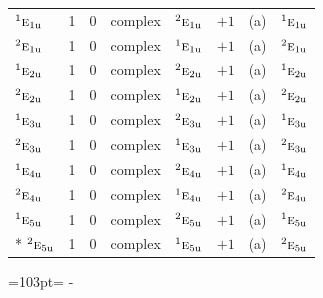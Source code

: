 \documentclass[10pt,a4paper]{article}
\newcommand{\needspace}[1]{\par\penalty-100\begingroup\dimen0=#1\relax\dimen2=\pagegoal
  \advance\dimen2-\pagetotal\ifdim\dimen0>\dimen2\relax\ifdim\dimen2>0pt\vfil\break\fi\fi
  \endgroup}
\numberwithin{equation}{section}
\newcommand{\irr}[1]{\text{\normalfont\scshape #1}}
\newcommand{\conjpair}[1]{{}^{#1}}
\newcommand{\ptag}[1]{\mathrm{#1}}
\begin{document}
{\begin{longtable}{@{}lrrllrll@{}}
$\conjpair{1}\irr{e}_{1\ptag{u}}$ & 1 & $0$ & complex & $\conjpair{2}\irr{e}_{1\ptag{u}}$ & $+1$ & (a) & $\conjpair{1}\irr{e}_{1\ptag{u}}$\\
$\conjpair{2}\irr{e}_{1\ptag{u}}$ & 1 & $0$ & complex & $\conjpair{1}\irr{e}_{1\ptag{u}}$ & $+1$ & (a) & $\conjpair{2}\irr{e}_{1\ptag{u}}$\\
$\conjpair{1}\irr{e}_{2\ptag{u}}$ & 1 & $0$ & complex & $\conjpair{2}\irr{e}_{2\ptag{u}}$ & $+1$ & (a) & $\conjpair{1}\irr{e}_{2\ptag{u}}$\\
$\conjpair{2}\irr{e}_{2\ptag{u}}$ & 1 & $0$ & complex & $\conjpair{1}\irr{e}_{2\ptag{u}}$ & $+1$ & (a) & $\conjpair{2}\irr{e}_{2\ptag{u}}$\\
$\conjpair{1}\irr{e}_{3\ptag{u}}$ & 1 & $0$ & complex & $\conjpair{2}\irr{e}_{3\ptag{u}}$ & $+1$ & (a) & $\conjpair{1}\irr{e}_{3\ptag{u}}$\\
$\conjpair{2}\irr{e}_{3\ptag{u}}$ & 1 & $0$ & complex & $\conjpair{1}\irr{e}_{3\ptag{u}}$ & $+1$ & (a) & $\conjpair{2}\irr{e}_{3\ptag{u}}$\\
$\conjpair{1}\irr{e}_{4\ptag{u}}$ & 1 & $0$ & complex & $\conjpair{2}\irr{e}_{4\ptag{u}}$ & $+1$ & (a) & $\conjpair{1}\irr{e}_{4\ptag{u}}$\\
$\conjpair{2}\irr{e}_{4\ptag{u}}$ & 1 & $0$ & complex & $\conjpair{1}\irr{e}_{4\ptag{u}}$ & $+1$ & (a) & $\conjpair{2}\irr{e}_{4\ptag{u}}$\\
$\conjpair{1}\irr{e}_{5\ptag{u}}$ & 1 & $0$ & complex & $\conjpair{2}\irr{e}_{5\ptag{u}}$ & $+1$ & (a) & $\conjpair{1}\irr{e}_{5\ptag{u}}$\\*
$\conjpair{2}\irr{e}_{5\ptag{u}}$ & 1 & $0$ & complex & $\conjpair{1}\irr{e}_{5\ptag{u}}$ & $+1$ & (a) & $\conjpair{2}\irr{e}_{5\ptag{u}}$\\
\bottomrule\end{longtable}}
\needspace{103pt}
\end{document}
